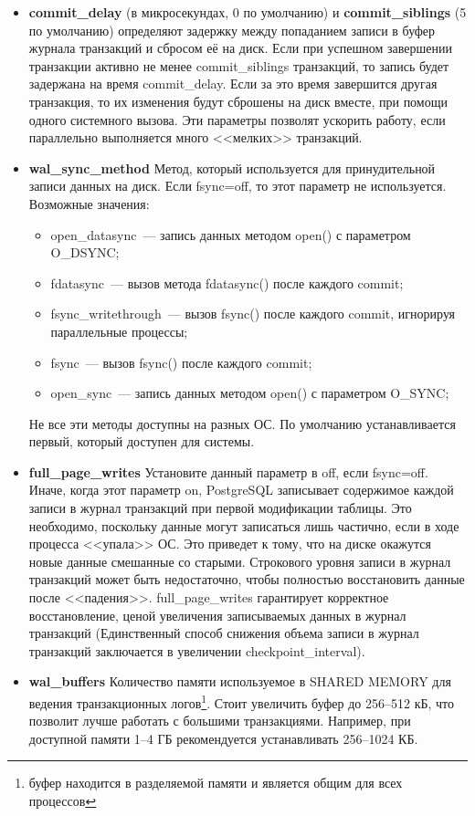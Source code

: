 \begin{itemize}
  \item \textbf{commit\_delay} (в микросекундах, 0 по умолчанию) и \textbf{commit\_sib\-lings} (5 по умолчанию) определяют задержку между попаданием записи в буфер журнала транзакций и сбросом её на диск. Если при успешном завершении транзакции активно не менее commit\_siblings транзакций, то запись будет задержана на время commit\_delay. Если за это время завершится другая транзакция, то их изменения будут сброшены на диск вместе, при помощи одного системного вызова. Эти параметры позволят ускорить работу, если параллельно выполняется много <<мелких>> транзакций.

  \item \textbf{wal\_sync\_method} Метод, который используется для принудительной записи данных на диск. Если fsync=off, то этот параметр не используется. Возможные значения:
  \begin{itemize}
    \item open\_datasync~--- запись данных методом open() с параметром O\_DSYNC;
    \item fdatasync~--- вызов метода fdatasync() после каждого commit;
    \item fsync\_writethrough~--- вызов fsync() после каждого commit, игнорируя параллельные процессы;
    \item fsync~--- вызов fsync() после каждого commit;
    \item open\_sync~--- запись данных методом open() с параметром O\_SYNC;
  \end{itemize}

  Не все эти методы доступны на разных ОС. По умолчанию устанавливается первый, который доступен для системы.

  \item \textbf{full\_page\_writes} Установите данный параметр в off, если fsync=off. Иначе, когда этот параметр on, PostgreSQL записывает содержимое каждой записи в журнал транзакций при первой модификации таблицы. Это необходимо, поскольку данные могут записаться лишь частично, если в ходе процесса <<упала>> ОС. Это приведет к тому, что на диске окажутся новые данные смешанные со старыми. Строкового уровня записи в журнал транзакций может быть недостаточно, чтобы полностью восстановить данные после <<падения>>. full\_page\_writes гарантирует корректное восстановление, ценой увеличения записываемых данных в журнал транзакций (Единственный способ снижения объема записи в журнал транзакций заключается в увеличении checkpoint\_interval).

  \item \textbf{wal\_buffers} Количество памяти используемое в SHARED MEMORY для ведения транзакционных логов\footnote{буфер находится в разделяемой памяти и является общим для всех процессов}. Стоит увеличить буфер до 256--512 кБ, что позволит лучше работать с большими транзакциями. Например, при доступной памяти 1--4 ГБ рекомендуется устанавливать 256--1024 КБ.
\end{itemize}


